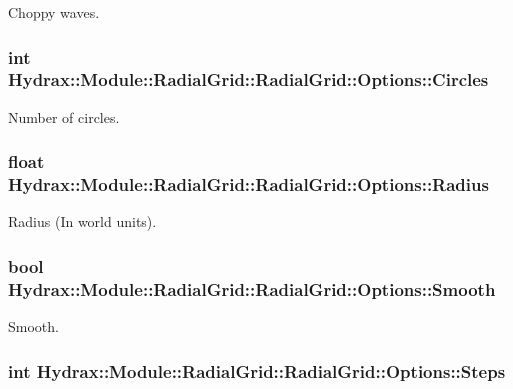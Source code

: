 Choppy waves. 

\hypertarget{struct_hydrax_1_1_module_1_1_radial_grid_1_1_options_efe98acc6ec2bfcbd0776ec43343819e}{
\subsubsection[{Circles}]{\setlength{\rightskip}{0pt plus 5cm}int Hydrax::Module::RadialGrid::RadialGrid::Options::Circles}}
\label{struct_hydrax_1_1_module_1_1_radial_grid_1_1_options_efe98acc6ec2bfcbd0776ec43343819e}


Number of circles. 

\hypertarget{struct_hydrax_1_1_module_1_1_radial_grid_1_1_options_2ebdfa6131bc283e2cc3ec8d74a3d712}{
\subsubsection[{Radius}]{\setlength{\rightskip}{0pt plus 5cm}float Hydrax::Module::RadialGrid::RadialGrid::Options::Radius}}
\label{struct_hydrax_1_1_module_1_1_radial_grid_1_1_options_2ebdfa6131bc283e2cc3ec8d74a3d712}


Radius (In world units). 

\hypertarget{struct_hydrax_1_1_module_1_1_radial_grid_1_1_options_1004e40adf66a0c305bb6cb4ca46d4a6}{
\subsubsection[{Smooth}]{\setlength{\rightskip}{0pt plus 5cm}bool Hydrax::Module::RadialGrid::RadialGrid::Options::Smooth}}
\label{struct_hydrax_1_1_module_1_1_radial_grid_1_1_options_1004e40adf66a0c305bb6cb4ca46d4a6}


Smooth. 

\hypertarget{struct_hydrax_1_1_module_1_1_radial_grid_1_1_options_902da4f0f8dfa6f9e47e48a7af346e2b}{
\subsubsection[{Steps}]{\setlength{\rightskip}{0pt plus 5cm}int Hydrax::Module::RadialGrid::RadialGrid::Options::Steps}}
\label{struct_hydrax_1_1_module_1_1_radial_grid_1_1_options_902da4f0f8dfa6f9e47e48a7af346e2b}


